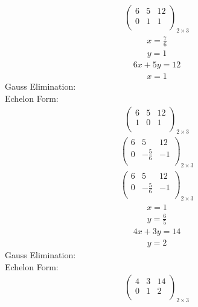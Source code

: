 \documentclass{article}
\begin{document}
\begin{align*}
\left(
\begin{array}{cc|c}
6 & 5 & 12\\
0 & 1 & 1\\
\end{array}
\right)_{2\times 3}
\end{align*}
\begin{align*}
x=\frac{7}{6}\end{align*}
\begin{align*}
y=1\end{align*}
\begin{align*}
6x + 5y=12\end{align*}
\begin{align*}
x=1\end{align*}
Gauss Elimination:\\
Echelon Form:\\
\begin{align*}
\left(
\begin{array}{cc|c}
6 & 5 & 12\\
1 & 0 & 1\\
\end{array}
\right)_{2\times 3}
\end{align*}
\begin{align*}
\left(
\begin{array}{cc|c}
6 & 5 & 12\\
0 & -\frac{5}{6} & -1\\
\end{array}
\right)_{2\times 3}
\end{align*}
\begin{align*}
\left(
\begin{array}{cc|c}
6 & 5 & 12\\
0 & -\frac{5}{6} & -1\\
\end{array}
\right)_{2\times 3}
\end{align*}
\begin{align*}
x=1\end{align*}
\begin{align*}
y=\frac{6}{5}\end{align*}
\begin{align*}
4x + 3y=14\end{align*}
\begin{align*}
y=2\end{align*}
Gauss Elimination:\\
Echelon Form:\\
\begin{align*}
\left(
\begin{array}{cc|c}
4 & 3 & 14\\
0 & 1 & 2\\
\end{array}
\right)_{2\times 3}
\end{align*}
\end{document}
